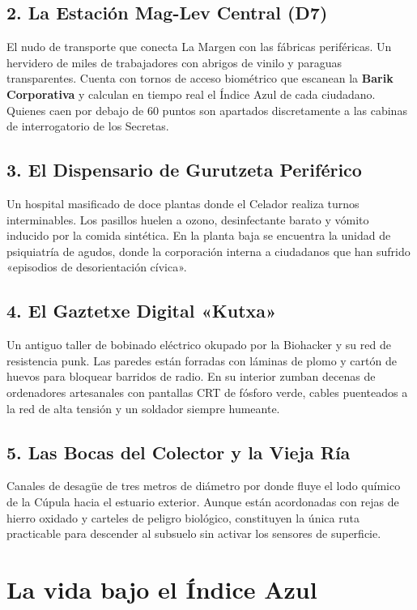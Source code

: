 \subsection{2. La Estación Mag-Lev Central (D7)}
El nudo de transporte que conecta La Margen con las fábricas periféricas. Un hervidero de miles de trabajadores con abrigos de vinilo y paraguas transparentes. Cuenta con tornos de acceso biométrico que escanean la \textbf{Barik Corporativa} y calculan en tiempo real el Índice Azul de cada ciudadano. Quienes caen por debajo de 60 puntos son apartados discretamente a las cabinas de interrogatorio de los Secretas.

\subsection{3. El Dispensario de Gurutzeta Periférico}
Un hospital masificado de doce plantas donde el Celador realiza turnos interminables. Los pasillos huelen a ozono, desinfectante barato y vómito inducido por la comida sintética. En la planta baja se encuentra la unidad de psiquiatría de agudos, donde la corporación interna a ciudadanos que han sufrido «episodios de desorientación cívica».

\subsection{4. El Gaztetxe Digital «Kutxa»}
Un antiguo taller de bobinado eléctrico okupado por la Biohacker y su red de resistencia punk. Las paredes están forradas con láminas de plomo y cartón de huevos para bloquear barridos de radio. En su interior zumban decenas de ordenadores artesanales con pantallas CRT de fósforo verde, cables puenteados a la red de alta tensión y un soldador siempre humeante.

\subsection{5. Las Bocas del Colector y la Vieja Ría}
Canales de desagüe de tres metros de diámetro por donde fluye el lodo químico de la Cúpula hacia el estuario exterior. Aunque están acordonadas con rejas de hierro oxidado y carteles de peligro biológico, constituyen la única ruta practicable para descender al subsuelo sin activar los sensores de superficie.

\section{La vida bajo el Índice Azul}

